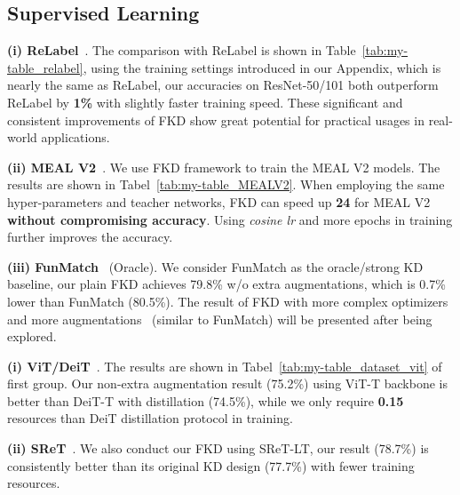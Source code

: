 \documentclass[10pt,twocolumn,letterpaper]{article}
\begin{document}
\subsection{Supervised Learning}



{\bf (i) ReLabel}~\cite{yun2021re}. The comparison with ReLabel is shown in Table~\ref{tab:my-table_relabel}, using the training settings introduced in our Appendix, which is nearly the same as ReLabel, our accuracies on ResNet-50/101 both outperform ReLabel by {\bf 1\%} with slightly faster training speed. These significant and consistent improvements of FKD show great potential for practical usages in real-world applications.


{\bf (ii) MEAL V2}~\cite{shen2020meal}. We use FKD framework to train the MEAL V2 models. The results are shown in Tabel~\ref{tab:my-table_MEALV2}. When employing the same hyper-parameters and teacher networks, FKD can speed up {\bf 24} for MEAL V2 {\bf without compromising accuracy}. Using {\em cosine lr} and more epochs in training further improves the accuracy.


{\bf (iii) FunMatch}~\cite{beyer2021knowledge} (Oracle). We consider FunMatch as the oracle/strong KD baseline, our plain FKD achieves 79.8\% w/o extra augmentations, which is 0.7\% lower than FunMatch (80.5\%). The result of FKD with more complex optimizers~\cite{loshchilov2018decoupled,you2017large} and more augmentations~\cite{zhang2018mixup,yun2019cutmix} (similar to FunMatch) will be presented after being explored.

\vspace{0.02in}
\vspace{0.02in}

{\bf (i) ViT/DeiT}~\cite{dosovitskiy2020image,touvron2021training}. The results are shown in Tabel~\ref{tab:my-table_dataset_vit} of first group. Our non-extra augmentation result (75.2\%) using ViT-T backbone is better than DeiT-T with distillation (74.5\%), while we only require {\bf 0.15} resources than DeiT distillation protocol in training.

{\bf (ii) SReT}~\cite{shen2021sliced}. We also conduct our FKD using SReT-LT, our result (78.7\%) is consistently better than its original KD design (77.7\%) with fewer training resources.
\end{document}
